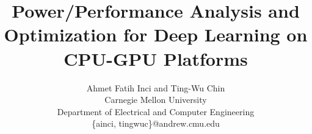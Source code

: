\documentclass[times, 10pt,twocolumn]{article}
\begin{document}
\title{Power/Performance Analysis and Optimization for Deep Learning on CPU-GPU Platforms}

\author{Ahmet Fatih Inci and Ting-Wu Chin  \\
Carnegie Mellon University\\ Department of Electrical and Computer Engineering \\ \{ainci, tingwuc\}@andrew.cmu.edu\\
}
\maketitle
\thispagestyle{empty}

\begin{abstract}

\end{abstract}









\end{document}
